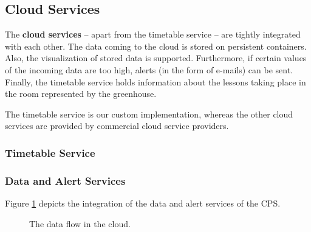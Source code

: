 \documentclass[a4paper, 11pt]{article}
\begin{document}
	\subsection{Cloud Services}
	The \textbf{cloud services} -- apart from the timetable service -- are tightly integrated with each other. The data coming to the cloud is stored on persistent containers. Also, the visualization of stored data is supported. Furthermore, if certain values of the incoming data are too high, alerts (in the form of e-mails) can be sent. Finally, the timetable service holds information about the lessons taking place in the room represented by the greenhouse.
	
	The timetable service is our custom implementation, whereas the other cloud services are provided by commercial cloud service providers.
	
	\subsubsection{Timetable Service}
	
	\subsubsection{Data and Alert Services}
	
	Figure \ref{fig:cloud} depicts the integration of the data and alert services of the CPS.
		
	\begin{figure}[h!]
		\center
		\caption{The data flow in the cloud.}
		\label{fig:cloud}
	\end{figure}
	
\end{document}

